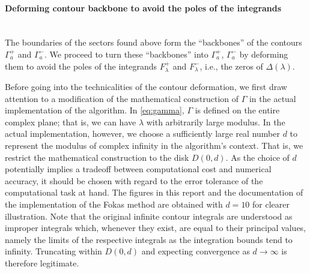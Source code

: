 \documentclass[12pt, oneside, a4paper]{article}
\begin{document}
\paragraph{Deforming contour backbone to avoid the poles of the integrands}\label{sec:deform_contours}\mbox{}\\
The boundaries of the sectors found above form the ``backbones'' of the contours $\Gamma_a^+$ and $\Gamma_a^-$. We proceed to turn these ``backbones'' into $\Gamma_a^+$, $\Gamma_a^-$ by deforming them to avoid  the poles of the integrands $F^+_\lambda$ and $F^-_\lambda$, i.e., the zeros of $\Delta(\lambda)$. 

Before going into the technicalities of the contour deformation, we first draw attention to a modification of the mathematical construction of $\Gamma$ in the actual implementation of the algorithm. In \eqref{eq:gamma}, $\Gamma$ is defined on the entire complex plane; that is, we can have $\lambda$ with arbitrarily large modulus. In the actual implementation, however, we choose a sufficiently large real number $d$ to represent the modulus of complex infinity in the algorithm's context. That is, we restrict the mathematical construction to the disk $D(0, d)$. As the choice of $d$ potentially implies a tradeoff between computational cost and numerical accuracy, it should be chosen with regard to the error tolerance of the computational task at hand. The figures in this report and the documentation of the implementation of the Fokas method \cite{Xiao} are obtained with $d=10$ for clearer illustration. Note that the original infinite contour integrals are understood as improper integrals which, whenever they exist, are equal to their principal values, namely the limits of the respective integrals as the integration bounds tend to infinity. Truncating within $D(0,d)$ and expecting convergence as $d\to\infty$ is therefore legitimate.
\end{document}
